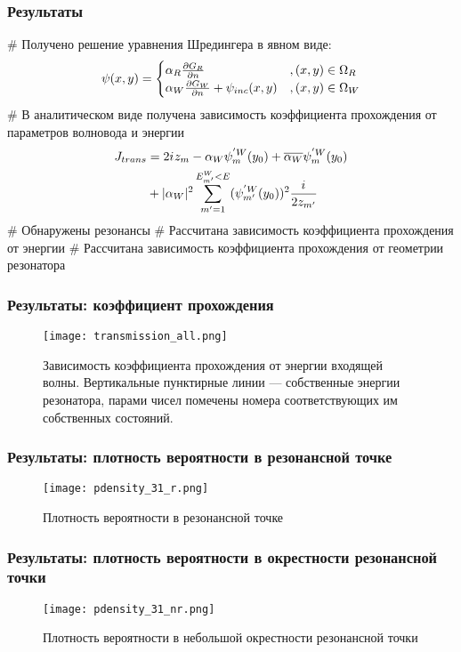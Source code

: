 \documentclass{beamer}
\begin{document}
\begin{frame}[fragile]
\frametitle{Результаты}
\begin{easylist}[itemize]
# Получено решение уравнения Шредингера в явном виде:
\[
\psi(x, y) =
\begin{cases}
\alpha_R \pdv{G_R}{n} (x, y, x_0, y_0; k) &, (x, y) \in \Omega_R \\
\alpha_W \pdv{G_W}{n} (x, y, x_0, y_0; k) + \psi_{inc}(x, y) &, (x, y) \in \Omega_W  
\end{cases}
\]
# В аналитическом виде получена зависимость коэффициента прохождения от параметров волновода и энергии
\begin{align*}
J_{trans}
&= 2 {i\mkern1mu} z_m - \alpha_W \psi_m^{'W}(y_0) + \overline{\alpha_W} \psi_m^{'W}(y_0)\\
&+ |\alpha_W|^2 \sum_{m'= 1}^{E^W_{m'} < E} (\psi_{m'}^{'W}(y_0))^2 \frac{{i\mkern1mu}}{2 z_{m'}}
\end{align*}
# Обнаружены резонансы
# Рассчитана зависимость коэффициента прохождения от энергии
# Рассчитана зависимость коэффициента прохождения от геометрии резонатора
\end{easylist}
\end{frame}

\begin{frame}[fragile]
\frametitle{Результаты: коэффициент прохождения}
\begin{figure}
\texttt{[image: transmission\_all.png]}
\caption{Зависимость коэффициента прохождения от энергии входящей волны. Вертикальные пунктирные линии — собственные энергии резонатора, парами чисел помечены номера соответствующих им собственных состояний.}
\end{figure}
\end{frame}

\begin{frame}[fragile]
\frametitle{Результаты: плотность вероятности в резонансной точке}
\begin{figure}
\texttt{[image: pdensity\_31\_r.png]}
\caption{Плотность вероятности в резонансной точке}
\end{figure}
\end{frame}

\begin{frame}[fragile]
\frametitle{Результаты: плотность вероятности в окрестности резонансной точки}
\begin{figure}
\texttt{[image: pdensity\_31\_nr.png]}
\caption{Плотность вероятности в небольшой окрестности резонансной точки}
\end{figure}
\end{frame}
\end{document}
